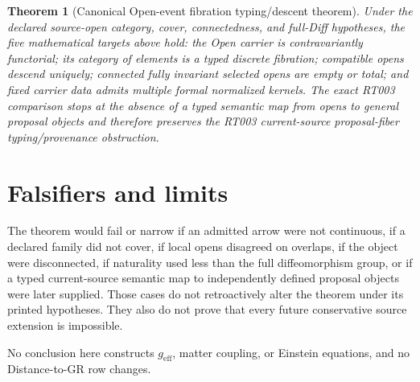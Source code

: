 \documentclass[11pt]{article}
\newtheorem{theorem}{Theorem}
\begin{document}
\begin{theorem}[Canonical Open-event fibration typing/descent theorem]
Under the declared source-open category, cover, connectedness, and full-Diff
hypotheses, the five mathematical targets above hold: the Open carrier is
contravariantly functorial; its category of elements is a typed discrete
fibration; compatible opens descend uniquely; connected fully invariant
selected opens are empty or total; and fixed carrier data admits multiple
formal normalized kernels.  The exact RT003 comparison stops at the absence of
a typed semantic map from opens to general proposal objects and therefore
preserves the RT003 current-source proposal-fiber typing/provenance obstruction.
\end{theorem}

\section{Falsifiers and limits}

The theorem would fail or narrow if an admitted arrow were not continuous, if
a declared family did not cover, if local opens disagreed on overlaps, if the
object were disconnected, if naturality used less than the full diffeomorphism
group, or if a typed current-source semantic map to independently defined
proposal objects were later supplied.  Those cases do not retroactively alter
the theorem under its printed hypotheses.  They also do not prove that every
future conservative source extension is impossible.

No conclusion here constructs $g_{\mathrm{eff}}$, matter coupling, or Einstein
equations, and no Distance-to-GR row changes.
\end{document}
